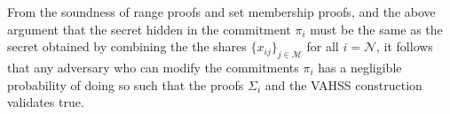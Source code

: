 From the soundness of range proofs and set membership proofs, and the above argument that the secret hidden in the commitment $\pi_i$ must be the same as the secret obtained by combining the the shares $\{x_{ij}\}_{j\in\mathcal{M}}$ for all $i=\mathcal{N}$, it follows that any adversary who can modify the commitments $\pi_i$ has a negligible probability of doing so such that the proofs $\Sigma_i$ and the VAHSS construction validates true.

\begin{comment}
The correctness follows from the correctness of range proofs and by proving that $\sigma= \prod_{i=1}^n \pi_i \:\bigwedge\: \prod_{i=1}^n \pi_i = \mathcal{H}(y)$. Both $y$ and $\sigma$ are the same as in Construction \ref{alg:VAHSS-HSS}, hence by construction:
\begin{align}
    \label{eq:y=sum(x_ij)}
    y = \sum_{j=1}^m y_j= \sum_{j=1}^m \sum_{i=1}^n \lambda_{ij}p_i(\theta_{ij}) = \sum_{i=1}^n \overbrace{ \Big (\sum_{j=1}^m \lambda_{ij}p_i(\theta_{ij}) \Big)}^{ p_i(0)} = \sum_{i=1}^n p_i(0) = \sum_{i=1}^n x_i,
\end{align}
and for $\sigma$ it holds that:
\begin{align*}
    \sigma = \prod_{j=1}^m \sigma_j = \prod_{j=1}^m g^{y_j} = g^{\sum_{j=1}^my_j} =g^y = \mathcal{H}(y)
\end{align*}
For the $\pi_i$, whose construction has been modified compared to $\tau_i$ in  Construction\ref{alg:VAHSS-HSS}, thus it follows that:
\begin{align*}
    &\prod_{i=1}^n \pi_i = \prod_{i=1}^n \mathds{E}(x_i,R_i)= \prod_{i=1}^n g^{x_i}h^{R_i} = g^{\sum_{i=1}^n x_i } h^{\sum_{i=1}^n R_i} \overset{\eqref{eq:y=sum(x_ij)}}{=} g^y h^{\sum_{i=1}^{n-1} R_i+R_n} = \\ 
    &= g^y h^{ \phi(N)\big\lceil \frac{\sum_{i=1}^{n-1}R_i}{\phi(N) }\big\rceil} = g^y = \mathcal{H}(y) 
\end{align*}

The proof of security argument for malicious servers given in \cite{SumItUp} is still sufficient since the Pedersen commitment is perfectly hiding and computationally binding and that the range proofs are zero-knowledge. The security argument for malicious clients follows from the soundness of the range proof and that the secret hidden in the commitment has to be the same as the secret in the shares, as argued above. . 

The proof of \textit{\textbf{Verifiability Severs}} is the same as the proof given in  in \cite{SumItUp}, except that the commitments $\pi_i$ replaces the checksums $\tau_i$.  \textit{\textbf{Verifiability Clients}} follows from the properties of the range proof.
\end{comment}

